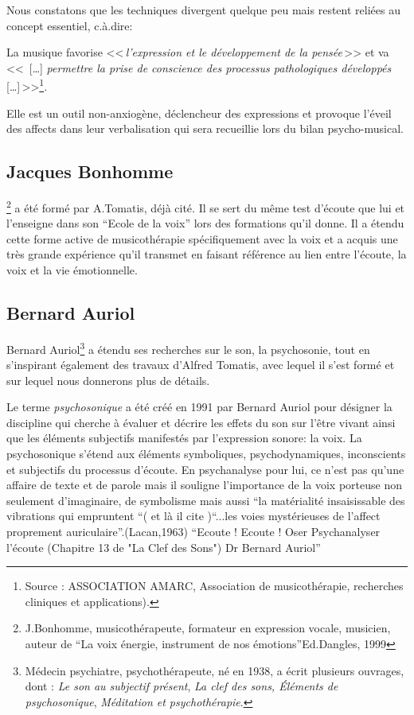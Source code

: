Nous constatons que les techniques divergent quelque peu mais restent
reliées au concept essentiel, c.à.dire: 

La musique favorise  <<\,\emph{l'expression et le développement
	de la pensée}\,>> et  va <<\, [\ldots] \emph{permettre la prise de conscience des processus pathologiques développés} [\ldots]\,>>\footnote{Source : ASSOCIATION AMARC,
  Association de musicothérapie, recherches cliniques et
  applications). }.

Elle est un outil non-anxiogène, déclencheur des expressions et provoque
l'éveil des affects dans  leur verbalisation qui sera recueillie lors
du bilan psycho-musical.
 
  \subsection{Jacques Bonhomme} \footnote{J.Bonhomme, musicothérapeute, formateur 
  	en expression vocale, musicien, auteur de ``La voix énergie,
        instrument de nos émotions''Ed.Dangles, 1999}  a 
      été formé par A.Tomatis, déjà cité. Il se sert du même test d'écoute
      que lui et l'enseigne dans son ``Ecole de la voix'' lors des
      formations qu'il donne. Il a étendu cette  forme active de musicothérapie
      spécifiquement avec la voix 
     et a acquis une
      très grande expérience qu'il transmet en   
      faisant référence au lien entre l'écoute, la voix et la vie émotionnelle.

 \subsection{Bernard Auriol}

Bernard Auriol\footnote{Médecin psychiatre, psychothérapeute, 
	né en 1938, a écrit plusieurs ouvrages, dont : \textsl{Le son au subjectif présent}, \textsl{La clef des sons, Éléments de psychosonique}, \textsl{Méditation et
  psychothérapie}.}
a étendu ses recherches sur le son, la psychosonie, 
tout en s'inspirant également des
travaux d'Alfred Tomatis, avec lequel il s'est formé et sur lequel
nous donnerons plus de détails.

Le terme \emph{psychosonique} a été créé en 1991 par Bernard Auriol pour
désigner la discipline qui cherche à évaluer et décrire les effets du
son sur l'être vivant ainsi que les éléments
subjectifs manifestés par l'expression sonore:  la
voix. 
La psychosonique s'étend aux éléments
symboliques, psychodynamiques, inconscients et subjectifs du processus
d'écoute. En psychanalyse pour lui, ce n'est pas qu'une affaire de
texte et de parole mais il souligne l'importance de la voix porteuse non seulement
d'imaginaire, de symbolisme mais aussi ``la matérialité insaisissable
des vibrations qui empruntent ``( et là il cite )``...les voies mystérieuses de
l'affect proprement auriculaire''.(Lacan,1963)
``Ecoute ! Ecoute !
Oser Psychanalyser l'écoute
(Chapitre 13 de "La Clef des Sons")
Dr Bernard Auriol''



